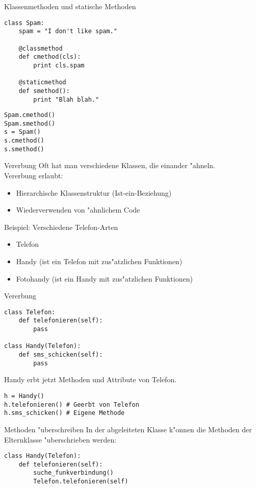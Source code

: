 \begin{frame}[fragile]{Klassenmethoden und statische Methoden}
\begin{lstlisting}[style=Python]
class Spam:
    spam = "I don't like spam."

    @classmethod
    def cmethod(cls):
        print cls.spam
       
    @staticmethod
    def smethod():
        print "Blah blah."
\end{lstlisting}
\begin{lstlisting}[style=Python]
Spam.cmethod()
Spam.smethod()
s = Spam()
s.cmethod()
s.smethod()
\end{lstlisting}
\end{frame}

\begin{frame}{Vererbung}
Oft hat man verschiedene Klassen, die einander "ahneln.\\
\alert{Vererbung} erlaubt:
\begin{itemize}
\item Hierarchische Klassenstruktur (Ist-ein-Beziehung)
\item Wiederverwenden von "ahnlichem Code
\end{itemize}
\vspace{5mm}
Beispiel: Verschiedene Telefon-Arten
\begin{itemize}
\item Telefon
\item Handy (ist ein Telefon mit zus"atzlichen Funktionen)
\item Fotohandy (ist ein Handy mit zus"atzlichen Funktionen)
\end{itemize}
\end{frame}

\begin{frame}[fragile]{Vererbung}
\begin{lstlisting}[style=Python]
class Telefon:
    def telefonieren(self):
        pass

class Handy(Telefon):
    def sms_schicken(self):
        pass
\end{lstlisting}
Handy erbt jetzt Methoden und Attribute von Telefon.
\begin{lstlisting}[style=Python]
h = Handy()
h.telefonieren() # Geerbt von Telefon
h.sms_schicken() # Eigene Methode
\end{lstlisting}
\end{frame}

\begin{frame}[fragile]{Methoden "uberschreiben}
In der abgeleiteten Klasse k"onnen die Methoden der Elternklasse "uberschrieben werden:
\begin{lstlisting}[style=Python]
class Handy(Telefon):
    def telefonieren(self):
        suche_funkverbindung()
        Telefon.telefonieren(self)
\end{lstlisting}
\end{frame}

